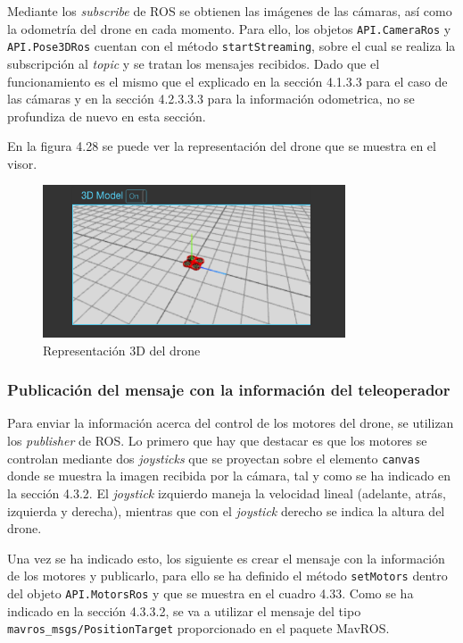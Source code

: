 Mediante los \textit{subscribe} de ROS se obtienen las imágenes de las cámaras, así como la odometría del drone en cada momento. Para ello, los objetos \texttt{API.CameraRos} y \texttt{API.Pose3DRos} cuentan con el método \texttt{startStreaming}, sobre el cual se realiza la subscripción al \textit{topic} y se tratan los mensajes recibidos. Dado que el funcionamiento es el mismo que el explicado en la sección 4.1.3.3 para el caso de las cámaras y en la sección 4.2.3.3.3 para la información odometrica, no se profundiza de nuevo en esta sección.

En la figura 4.28 se puede ver la representación del drone que se muestra en el visor.

\begin{figure}[H]
  \begin{center}
    \includegraphics[width=0.8\textwidth]{figures/3ddrone.png}
		\caption{Representación 3D del drone}
		\label{fig.3ddrone}
		\end{center}
\end{figure}

\subsubsection{Publicación del mensaje con la información del teleoperador}

Para enviar la información acerca del control de los motores del drone, se utilizan los \textit{publisher} de ROS. Lo primero que hay que destacar es que los motores se controlan mediante dos \textit{joysticks} que se proyectan sobre el elemento \texttt{canvas} donde se muestra la imagen recibida por la cámara, tal y como se ha indicado en la sección 4.3.2. El \textit{joystick} izquierdo maneja la velocidad lineal (adelante, atrás, izquierda y derecha), mientras que con el \textit{joystick} derecho se indica la altura del drone.

Una vez se ha indicado esto, los siguiente es crear el mensaje con la información de los motores y publicarlo, para ello se ha definido el método \texttt{setMotors} dentro del objeto \texttt{API.MotorsRos} y que se muestra en el cuadro 4.33. Como se ha indicado en la sección 4.3.3.2, se va a utilizar el mensaje del tipo \texttt{mavros\_msgs/PositionTarget} proporcionado en el paquete MavROS.


